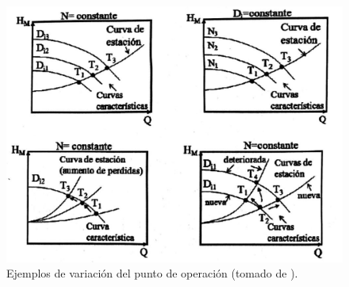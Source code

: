 \documentclass[11pt, oneside]{article}
\begin{document}
\begin{figure}[h]
\centering
\includegraphics[width=12cm]{./figs/bom15.jpeg}
\caption{Ejemplos de variaci\'on del punto de operaci\'on (tomado de \cite{agudelo2011mecanica}).} 
\label{bom15}
\end{figure}





\end{document}
